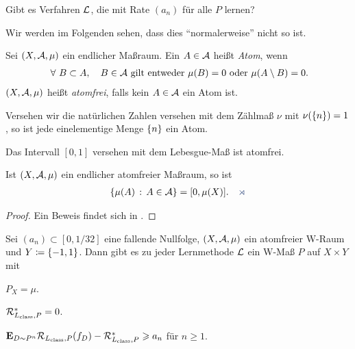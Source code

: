 \begin{prop*}
Gibt es Verfahren $\LL$, die mit Rate $(a_n)$ für alle $P$ lernen?\fishhere
\end{prop*}

Wir werden im Folgenden sehen, dass dies ``normalerweise'' nicht so ist.

\begin{defn}
\label{defn:1.4.2}
Sei $(X,\AA,\mu)$ ein endlicher Maßraum. Ein $A\in\AA$ heißt
\emph{Atom}, wenn
\begin{align*}
\forall B\subset A,\quad B\in\AA
\text{ gilt entweder }\mu(B)=0\text{ oder }\mu(A\setminus B) = 0.
\end{align*}
$(X,\AA,\mu)$ heißt \emph{atomfrei}, falls kein $A\in\AA$ ein Atom ist.\fishhere
\end{defn}

\begin{bsp*}
\begin{bspenum}
\item Versehen wir die natürlichen Zahlen versehen mit dem Zählmaß $\nu$ mit
$\nu(\setd{n})=1$, so ist jede einelementige Menge $\setd{n}$ ein Atom.
\item Das Intervall $[0,1]$ versehen mit dem Lebesgue-Maß ist atomfrei.\bsphere 
\end{bspenum}
\end{bsp*}

\begin{prop}
\label{prop:1.4.3}
Ist $(X,\AA,\mu)$ ein endlicher atomfreier Maßraum, so ist
\begin{align*}
\setdef{\mu(A)}{A\in\AA} = [0,\mu(X)].\fishhere
\end{align*}
\end{prop}
\begin{proof}
Ein Beweis findet sich in \cite{Werner07}.\qedhere
\end{proof}

\begin{prop}
\label{prop:1.4.4}
Sei $(a_n)\subset [0,1/32]$ eine fallende Nullfolge, $(X,\AA,\mu)$ ein
atomfreier W-Raum und $Y\defl\setd{-1,1}$. Dann gibt es zu jeder Lernmethode $\LL$
ein W-Maß $P$ auf $X\times Y$ mit
\begin{propenum}
\item $P_X = \mu$.
\item $\RR_{L_\class,P}^* = 0$.
\item $\E_{D\sim P^n} \RR_{L_\class,P}(f_D) - \RR_{L_\class,P}^* \ge a_n$ für
$n\ge 1$.\fishhere
\end{propenum}
\end{prop}

